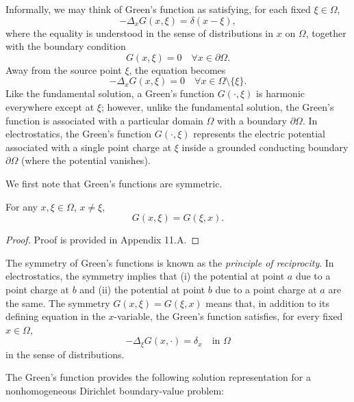 Informally, we may think of Green's function as satisfying, for each fixed $\xi \in \Omega$,
\[-\Delta_xG(x, \xi) = \delta(x - \xi),\]
where the equality is understood in the sense of distributions in $x$ on $\Omega$, together with the boundary condition
\[G(x, \xi) = 0 \quad \forall x \in \partial\Omega.\]
Away from the source point $\xi$, the equation becomes
\[-\Delta_xG(x, \xi) = 0 \quad \forall x \in \Omega \setminus \{\xi\}.\]
Like the fundamental solution, a Green's function $G(\cdot, \xi)$ is harmonic everywhere except at $\xi$; however, unlike the fundamental solution, the Green's function is associated with a particular domain $\Omega$ with a boundary $\partial\Omega$. In electrostatics, the Green's function $G(\cdot, \xi)$ represents the electric potential associated with a single point charge at $\xi$ inside a grounded conducting boundary $\partial\Omega$ (where the potential vanishes).

We first note that Green's functions are symmetric.

\begin{theorem}
    For any $x, \xi \in \Omega$, $x \neq \xi$,
    \[G(x, \xi) = G(\xi, x).\]
\end{theorem}
\begin{proof}
    Proof is provided in Appendix 11.A.
\end{proof}

The symmetry of Green's functions is known as the \textit{principle of reciprocity}. In electrostatics, the symmetry implies that (i) the potential at point $a$ due to a point charge at $b$ and (ii) the potential at point $b$ due to a point charge at $a$ are the same. The symmetry $G(x, \xi) = G(\xi, x)$ means that, in addition to its defining equation in the $x$-variable, the Green's function satisfies, for every fixed $x \in \Omega$,
\[-\Delta_\xi G(x, \cdot) = \delta_x \quad \text{in } \Omega\]
in the sense of distributions.

The Green's function provides the following solution representation for a nonhomogeneous Dirichlet boundary-value problem:

